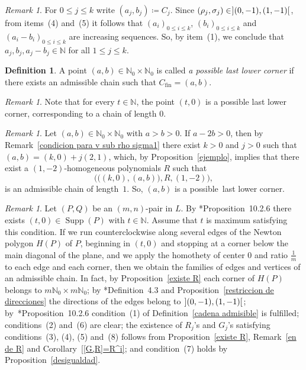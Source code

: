 \documentclass[reqno,a4paper]{amsart}
\theoremstyle{definition}
\newtheorem{definition}[theorem]{Definition}
\theoremstyle{remark}
\newtheorem{remark}[theorem]{Remark}
\DeclareMathOperator{\Supp}{Supp}
\begin{document}
\begin{remark}\label{los B_is crecen} For $0\le j\le k$ write $(a_j,b_j)\coloneqq C_j$. Since $(\rho_j,\sigma_j)\in \hspace{0.7pt}](0,-1),(1,-1) [\hspace{0.7pt}$, from items~(4) and~(5) it follows that $(a_i)_{0\le i\le k}$, $(b_i)_{0\le i\le k}$ and $(a_i-b_i)_{0\le i\le k}$ are increasing sequences. So, by item~(1), we conclude that $a_j,b_j,a_j-b_j\in \mathds{N}$ for all $1\le j\le k$.
\end{remark}

\begin{definition} \label{Definicion pllc} A point $(a,b)\in \mathds{N}_0\times\mathds{N}_0$ is called {\em a possible last lower corner} if there exists an admissible chain such that $C_{\text{fin}}=(a,b)$.
\end{definition}

\begin{remark} Note that for every $t\in\mathds{N}$, the point $(t,0)$ is a possible last lower corner, corresponding to a chain of length $0$.
\end{remark}

\begin{remark} Let $(a,b)\in\mathds{N}_0\times \mathds{N}_0$ with $a>b>0$. If $a-2b>0$, then by Remark~\ref{condicion para v sub rho sigma1} there exist $k>0$ and $j>0$ such that $(a,b)=(k,0)+j(2,1)$, which, by Proposition~\ref{ejemplo}, implies that there exist a $(1,-2)$-homogeneous polynomials $R$ such that
$$
\bigr(\bigl((k,0),(a,b)\bigr),R,(1,-2)\bigr),
$$
is an admissible chain of length~$1$. So, $(a,b)$ is a possible~last lower corner.
\end{remark}

\begin{remark}\label{parte inferior} Let $(P,Q)$ be an $(m,n)$-pair in $L$. By \cite{vdE}*{Proposition~10.2.6} there exists $(t,0)\in \Supp(P)$ with $t\in \mathds{N}$. Assume that $t$ is maximum satisfying this condition. If we run counterclockwise along several edges of the Newton polygon $H(P)$ of $P$, beginning in $(t,0)$ and stopping at a corner below the main diagonal of the plane, and we apply the homothety of center $0$ and ratio $\frac{1}{m}$ to each edge and each corner, then we obtain the families of edges and vertices of an admissible chain. In fact, by Proposition~\ref{existe R} each corner of $H(P)$ belongs to $m\mathds{N}_0\times m\mathds{N}_0$; by \cite{GGV}*{Definition~4.3} and Proposition~\ref{restriccion de direcciones} the directions of the edges belong to $\hspace{0.7pt}](0,-1),(1,-1)[\hspace{0.7pt}$; by~\cite{vdE}*{Proposition~10.2.6} condition~(1) of Definition~\ref{cadena admisible} is fulfilled; conditions~(2) and~(6) are clear; the existence of $R_j$'s and $G_j$'s satisfying conditions~(3), (4), (5) and~(8) follows from Proposition~\ref{existe R}, Remark~\ref{en de R} and Corollary~\ref{[G,R]=R^i}; and condition~(7) holds by Proposition~\ref{desigualdad}.
\end{remark}
\end{document}
